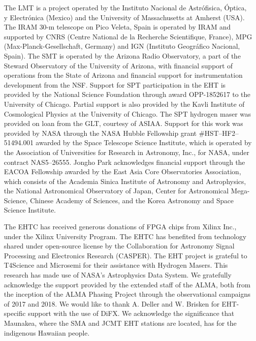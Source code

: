 The LMT is a project operated by the Instituto Nacional
de Astrófisica, Óptica, y Electrónica (Mexico) and the
University of Massachusetts at Amherst (USA). The
IRAM 30-m telescope on Pico Veleta, Spain is operated
by IRAM and supported by CNRS (Centre National de
la Recherche Scientifique, France), MPG (Max-Planck-Gesellschaft, Germany) 
and IGN (Instituto Geográfico
Nacional, Spain). The SMT is operated by the Arizona
Radio Observatory, a part of the Steward Observatory
of the University of Arizona, with financial support of
operations from the State of Arizona and financial support
for instrumentation development from the NSF.
Support for SPT participation in the EHT is provided by the National Science Foundation through award OPP-1852617 
to the University of Chicago. Partial support is also 
provided by the Kavli Institute of Cosmological Physics at the University of Chicago. The SPT hydrogen maser was 
provided on loan from the GLT, courtesy of ASIAA.
Support for this work was provided by NASA through the NASA Hubble Fellowship grant
\#HST--HF2--51494.001 awarded by the Space Telescope Science Institute, which is operated 
by the Association of Universities for Research in Astronomy, Inc., for NASA, 
under contract NAS5--26555.
Jongho Park acknowledges financial support through the EACOA Fellowship awarded by the East Asia Core
Observatories Association, which consists of the Academia Sinica Institute of Astronomy and
Astrophysics, the National Astronomical Observatory of Japan, Center for Astronomical Mega-Science,
Chinese Academy of Sciences, and the Korea Astronomy and Space Science Institute.

The EHTC has
received generous donations of FPGA chips from Xilinx
Inc., under the Xilinx University Program. The EHTC
has benefited from technology shared under open-source
license by the Collaboration for Astronomy Signal Processing
and Electronics Research (CASPER). The EHT
project is grateful to T4Science and Microsemi for their
assistance with Hydrogen Masers. This research has
made use of NASA’s Astrophysics Data System. We
gratefully acknowledge the support provided by the extended
staff of the ALMA, both from the inception of
the ALMA Phasing Project through the observational
campaigns of 2017 and 2018. We would like to thank
A. Deller and W. Brisken for EHT-specific support with
the use of DiFX. We acknowledge the significance that
Maunakea, where the SMA and JCMT EHT stations
are located, has for the indigenous Hawaiian people.

